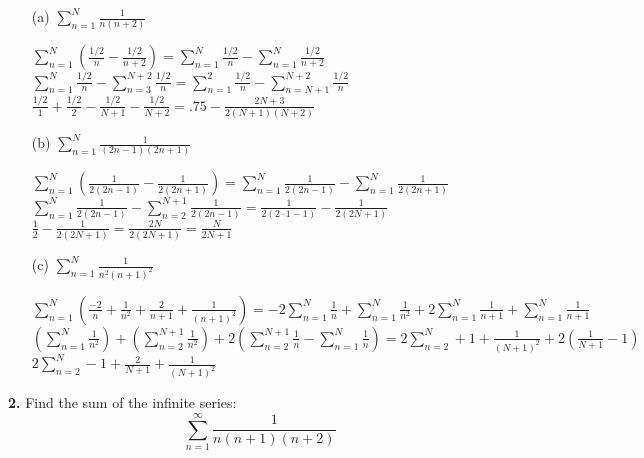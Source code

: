 \documentclass[12pt]{article}
\begin{document}
\begin{enumerate}
\item[(a)] $\sum_{n=1}^{N} \frac{1}{n(n+2)}$
\\[8pt]
\begin{minipage}[t][3cm][t]{\linewidth}
    $\displaystyle \sum_{n=1}^{N} (\frac{1/2}{n} - \frac{1/2}{n+2}) = \sum_{n=1}^{N} \frac{1/2}{n} - \sum_{n=1}^{N} \frac{1/2}{n+2}$
    \\[8pt] $\sum_{n=1}^{N} \frac{1/2}{n} - \sum_{n=3}^{N+2} \frac{1/2}{n} = \sum_{n=1}^{2} \frac{1/2}{n} - \sum_{n=N+1}^{N+2} \frac{1/2}{n}$
    \\[8pt] $\frac{1/2}{1}+\frac{1/2}{2} - \frac{1/2}{N+1}-\frac{1/2}{N+2} = .75-\frac{2N+3}{2(N+1)(N+2)}$
\end{minipage}

\item[(b)] $\sum_{n=1}^{N} \frac{1}{(2n-1)(2n+1)}$
\\[8pt]
\begin{minipage}[t][3cm][t]{\linewidth}
    $\displaystyle \sum_{n=1}^{N} (\frac{1}{2(2n-1)} - \frac{1}{2(2n+1)}) = \sum_{n=1}^{N} \frac{1}{2(2n-1)} - \sum_{n=1}^{N} \frac{1}{2(2n+1)}$
    \\[8pt] $\sum_{n=1}^{N} \frac{1}{2(2n-1)} - \sum_{n=2}^{N+1} \frac{1}{2(2n-1)} = \frac{1}{2(2\cdot1 - 1)} - \frac{1}{2(2N+1)}$
    \\[8pt] $\frac{1}{2} - \frac{1}{2(2N+1)} = \frac{2N}{2(2N+1)} = \frac{N}{2N+1}$
\end{minipage}

\item[(c)] $\sum_{n=1}^{N} \frac{1}{n^2(n+1)^2}$
\\[8pt]
\begin{minipage}[t][3cm][t]{\linewidth}
    $\displaystyle \sum_{n=1}^{N} (\frac{-2}{n} + \frac{1}{n^2} + \frac{2}{n+1} + \frac{1}{(n+1)^2}) = -2 \sum_{n=1}^{N} \frac{1}{n} + \sum_{n=1}^{N} \frac{1}{n^2} + 2 \sum_{n=1}^{N} \frac{1}{n+1} + \sum_{n=1}^{N} \frac{1}{n+1}$
    \\[8pt] $(\sum_{n=1}^{N} \frac{1}{n^2}) + (\sum_{n=2}^{N+1} \frac{1}{n^2}) + 2(\sum_{n=2}^{N+1} \frac{1}{n} - \sum_{n=1}^{N} \frac{1}{n}) = 2 \sum_{n=2}^{N} + 1 + \frac{1}{(N+1)^2} + 2(\frac{1}{N+1}-1)$
    \\[8pt] $2 \sum_{n=2}^{N} - 1 + \frac{2}{N+1} + \frac{1}{(N+1)^2}$
\end{minipage}
\end{enumerate}

\textbf{2.} Find the sum of the infinite series:
$$\sum_{n=1}^{\infty} \frac{1}{n(n+1)(n+2)}$$
\end{document}
